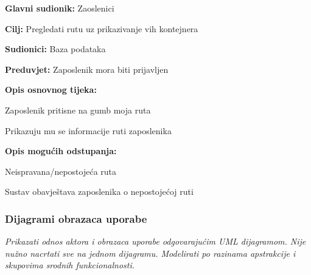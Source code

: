 			\noindent {}
			\begin{packed_item}
				
				\item \textbf{Glavni sudionik:} Zaoslenici
				\item  \textbf{Cilj:} Pregledati rutu uz prikazivanje vih kontejnera
				\item  \textbf{Sudionici:} Baza podataka
				\item  \textbf{Preduvjet:} Zaposlenik mora biti prijavljen
				\item  \textbf{Opis osnovnog tijeka:}
				
				\item[] \begin{packed_enum}
					
					\item Zaposlenik pritisne na gumb moja ruta
					\item Prikazuju mu se informacije ruti zaposlenika
					
				\end{packed_enum}
				
				\item  \textbf{Opis mogućih odstupanja:}
				
				\item[] \begin{packed_item}
					
					\item[2.a] Neispravana/nepostojeća ruta
					\item[] \begin{packed_enum}
						
						\item Sustav obavještava zaposlenika o nepostojećoj ruti

					\end{packed_enum}
					
				\end{packed_item}
			\end{packed_item}
			

			\subsubsection{Dijagrami obrazaca uporabe}

			\textit{Prikazati odnos aktora i obrazaca uporabe odgovarajućim UML dijagramom. Nije nužno nacrtati sve na jednom dijagramu. Modelirati po razinama apstrakcije i skupovima srodnih funkcionalnosti.}
			\eject		

